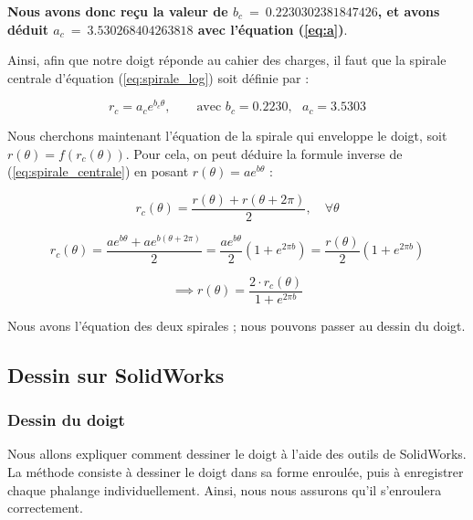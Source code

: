 \documentclass[a4paper, 11pt]{report}
\begin{document}
            \textbf{Nous avons donc reçu la valeur de $b_c\ =\ 0.2230302381847426$, et avons déduit $a_c\ =\ 3.530268404263818$ avec l'équation (\ref{eq:a})}.

        Ainsi, afin que notre doigt réponde au cahier des charges, il faut que la spirale centrale d'équation (\ref{eq:spirale_log}) soit définie par :

        \[
        r_c = a_c e^{b_c\theta}, \qquad \text{avec } b_c = 0.2230, \text{ } a_c = 3.5303
        \]

        Nous cherchons maintenant l'équation de la spirale qui enveloppe le doigt, soit $r(\theta) = f(r_c(\theta))$. Pour cela, on peut
        déduire la formule inverse de (\ref{eq:spirale_centrale}) en posant $r(\theta) = ae^{b\theta}$ :

        $$r_c(\theta) = \frac{r(\theta) + r(\theta + 2\pi)}{2}, \quad \forall \theta$$

        $$r_c(\theta) = \frac{ae^{b\theta} + ae^{b(\theta + 2\pi)}}{2}
        = \frac{ae^{b\theta}}{2}(1 + e^{2\pi b})
        = \frac{r(\theta)}{2}(1 + e^{2\pi b})$$

        \begin{equation}
            \implies r(\theta) = \frac{2 \cdot r_c(\theta)}{1 + e^{2\pi b}}
            \label{eq:spirale_centrale_inverse}
        \end{equation}

        Nous avons l'équation des deux spirales ; nous pouvons passer au dessin du doigt.

    \subsection{Dessin sur SolidWorks}

        \subsubsection{Dessin du doigt}
            
            Nous allons expliquer comment dessiner le doigt à l'aide des outils de SolidWorks. La méthode consiste à dessiner le doigt dans sa forme enroulée, puis à enregistrer chaque phalange individuellement. Ainsi, nous nous assurons qu'il s'enroulera correctement.
\end{document}
